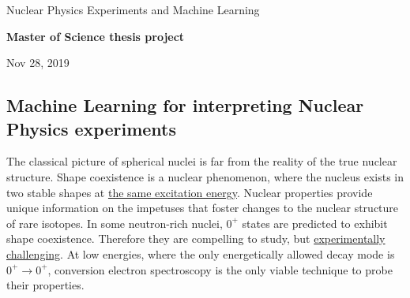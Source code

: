 \documentclass[%
oneside,                 %
final,                   %
10pt]{article}
\begin{document}

\newcommand{\exercisesection}[1]{\subsection*{#1}}






\thispagestyle{empty}

\begin{center}
{\LARGE\bf
\begin{spacing}{1.25}
Nuclear Physics Experiments and  Machine Learning
\end{spacing}
}
\end{center}


\begin{center}
{\bf Master of Science thesis project${}^{}$} \\ [0mm]
\end{center}

\begin{center}
\end{center}
    

\begin{center}
Nov 28, 2019
\end{center}

\vspace{1cm}


\subsection*{Machine Learning for interpreting Nuclear Physics experiments}



The classical picture of spherical nuclei is far from the reality of the
true nuclear structure. Shape coexistence is a nuclear phenomenon, where
the nucleus exists in two stable shapes at \href{{https://www.europhysicsnews.org/articles/epn/pdf/2001/01/epn01101.pdf}}{the same excitation energy}.
Nuclear properties provide unique information on the impetuses that
foster changes to the nuclear structure of rare isotopes. In some
neutron-rich nuclei, $0^{+}$ states are predicted to exhibit shape
coexistence. Therefore they are compelling to study, but \href{{http://iopscience.iop.org/article/10.1088/0954-3899/43/2/024001}}{experimentally
challenging}.
At low energies, where the only energetically allowed decay mode is
$0^{+} \rightarrow 0^{+}$, conversion electron spectroscopy is the
only viable technique to probe their properties.
\end{document}

